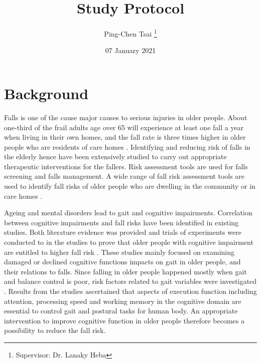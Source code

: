 \documentclass{article}
\title{Study Protocol}
\author{Ping-Chen Tsai  \thanks{Supervisor: Dr. Lanaky Heba}}
\date{07 January 2021}
\begin{document}
\maketitle

\tableofcontents
\pagebreak


\section{Background}
\begin{comment}
Aim: To place the study in the context of available evidence.
The background should be supported by appropriate references to published literature on the area of interest:
•	A thorough literature review of relevant studies and analysis, new research should build on formal review of prior evidence.
•	A brief description of the proposed study.
•	A description of the population to be studied.
•	relevant data from previous clinical trials such as efficacy, safety, tolerability

It should be written so it is easy to read and understand by someone with a basic sense of the topic who may not necessarily be an expert in the area. Some explanation of terms and concepts is likely to be beneficial. 
\end{comment}

Falls is one of the cause major causes to serious injuries in older people. About one-third of the frail adults age over 65 will experience at least one fall a year when living in their own homes, and the fall rate is three times higher in older people who are residents of care homes \cite{NHSFalls_2018, Robertson_2013}. Identifying and reducing risk of falls in the elderly hence have been extensively studied to carry out appropriate therapeutic interventions for the fallers. Risk assessment tools are used for falls screening and falls management. A wide range of fall risk assessment tools are used to identify fall risks of older people who are dwelling in the community \cite{PreventionofFalls2011} or in care homes \cite{Jung_2014, Kikkert_2017}. 

Ageing and mental disorders lead to gait and cognitive impairments. Correlation between cognitive impairments and fall risks have been identified in existing studies. Both literature evidence was provided and trials of experiments were conducted to in the studies to prove that older people with cognitive impairment are entitled to higher fall risk \cite{Yogev_Seligmann_2007,Martin_2012,Laurence_2017, Zhang_2019}. These studies mainly focused on examining damaged or declined cognitive functions impacts on gait in older people, and their relations to falls. Since falling in older people happened mostly when gait and balance control is poor, risk factors related to gait variables were investigated \cite{Zhang_2019, Mirelman_2012, Borowicz_2016}. Results from the studies ascertained that aspects of execution function including attention, processing speed and working memory in the cognitive domain are essential to control gait and postural tasks for human body. An appropriate intervention to improve cognitive function in older people therefore becomes a possibility to reduce the fall risk. 
\end{document}
